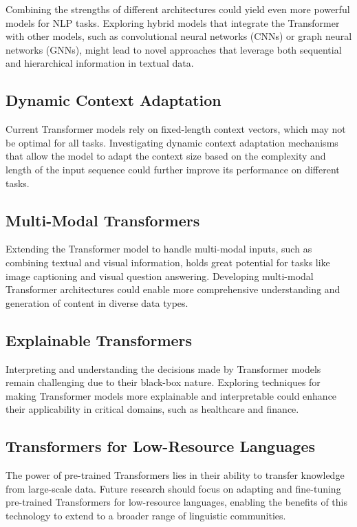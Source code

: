 \documentclass{article}
\begin{document}
Combining the strengths of different architectures could yield even more powerful models for NLP tasks. Exploring hybrid models that integrate the Transformer with other models, such as convolutional neural networks (CNNs) or graph neural networks (GNNs), might lead to novel approaches that leverage both sequential and hierarchical information in textual data.

\subsection{Dynamic Context Adaptation}

Current Transformer models rely on fixed-length context vectors, which may not be optimal for all tasks. Investigating dynamic context adaptation mechanisms that allow the model to adapt the context size based on the complexity and length of the input sequence could further improve its performance on different tasks.

\subsection{Multi-Modal Transformers}

Extending the Transformer model to handle multi-modal inputs, such as combining textual and visual information, holds great potential for tasks like image captioning and visual question answering. Developing multi-modal Transformer architectures could enable more comprehensive understanding and generation of content in diverse data types.

\subsection{Explainable Transformers}

Interpreting and understanding the decisions made by Transformer models remain challenging due to their black-box nature. Exploring techniques for making Transformer models more explainable and interpretable could enhance their applicability in critical domains, such as healthcare and finance.

\subsection{Transformers for Low-Resource Languages}

The power of pre-trained Transformers lies in their ability to transfer knowledge from large-scale data. Future research should focus on adapting and fine-tuning pre-trained Transformers for low-resource languages, enabling the benefits of this technology to extend to a broader range of linguistic communities.
\end{document}
